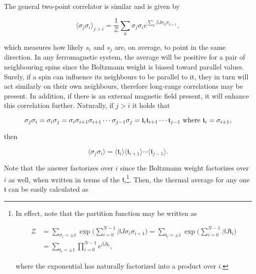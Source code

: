 \documentclass{homework}
\begin{document}
\blanky \\

The general two-point correlator is similar and is given by 

\begin{equation}
    \langle \sigma_j \sigma_i \rangle_{j > i} = \frac{1}{\mathcal{Z}} \sum_{k} \sigma_j \sigma_i e^{\sum_{k} \beta J \sigma_k \sigma_{k+1}},
\end{equation}

which measures how likely $s_i$ and $s_j$ are, on average, to point in the same direction. In any ferromagnetic system, the average will be positive for a pair of neighbouring spins since the Boltzmann weight is biased toward parallel values. Surely, if a spin can influence its neighbours to be parallel to it, they in turn will act similarly on their own neighbours, therefore long-range correlations may be present. In addition, if there is an external magnetic field present, it will enhance this correlation further. Naturally, if $j>i$ it holds that 

$$
\sigma_j \sigma_i = \sigma_i \sigma_j = \sigma_i \sigma_{i+1} \sigma_{i+1} \cdots \sigma_{j-1} \sigma_j = \mathfrak{t}_{i}\mathfrak{t}_{i+1}\cdots\mathfrak{t}_{j-1} \textnormal{ where } \mathfrak{t}_i = \sigma_{i+1}, 
$$

then 

\begin{equation}
    \langle \sigma_j \sigma_i \rangle = \langle \mathfrak{t}_i \rangle \langle \mathfrak{t}_{i+1} \rangle \cdots \langle \mathfrak{t}_{j-1} \rangle.
\end{equation}

Note that the answer factorizes over $i$ since the Boltzmann weight factorizes over $i$ as well, when written in terms of the $\mathfrak{t}_i$\footnote{In effect, note that the partition function may be written as 

\begin{equation}
\begin{split}
    \mathcal{Z} &= \sum_{\sigma_i = \pm 1} \exp \bigg(\sum_{i=0}^{N-1} \beta J \sigma_i \sigma_{i+1} \bigg) = \sum_{\mathfrak{t}_i = \pm 1} \exp \bigg(\sum_{i=0}^{N-1} \beta J \mathfrak{t}_i \bigg) \\
    &= \sum_{\mathfrak{t}_i = \pm 1} \prod_{i=0}^{N-1} e^{\beta J \mathfrak{t}_i},
\end{split}
\end{equation}

where the exponential has naturally factorized into a product over $i$.}. Then, the thermal average for any one $\mathfrak{t}$ can be easily calculated as 
\end{document}
